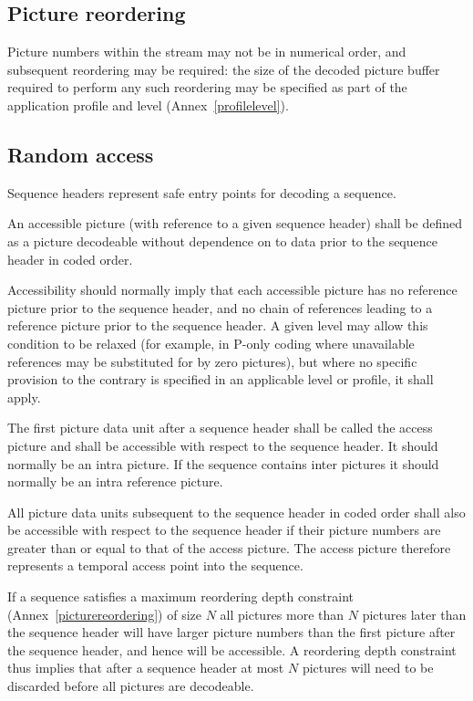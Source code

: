 \subsection{Picture reordering}
Picture numbers within the stream may not be in numerical order, and 
subsequent reordering may be required: the size  
of the decoded picture buffer required to perform any such reordering may be 
specified as part of the application profile and level (Annex~\ref{profilelevel}).
 
\subsection{Random access}
\label{randomaccess}
Sequence headers represent safe entry points for decoding a sequence. 

An accessible picture (with reference to a given sequence header)
shall be defined as a picture decodeable without dependence on 
to data prior to the sequence header in coded order.

Accessibility should normally imply that each accessible picture has
no reference picture prior to the sequence header, and no chain of 
references leading to a reference picture prior to the sequence header. 
A given level may allow this condition to
be relaxed (for example, in P-only coding where unavailable references
may be substituted for by zero pictures), but where no specific provision
to the contrary is specified in an applicable level or profile, it shall 
apply.

The first picture data unit after a sequence header shall be called the 
access picture and shall be accessible with respect to the sequence header.
It should normally be an intra picture. If the sequence contains inter pictures
it should normally be an intra reference picture.

All picture data units subsequent to the sequence header in coded order 
shall also be accessible with respect to the sequence header
if their picture numbers are greater than 
or equal to that of the access picture. The access picture therefore represents 
a temporal access point into the sequence.

\begin{informative}

If a sequence satisfies a maximum reordering depth constraint 
(Annex~\ref{picturereordering})
of size $N$ all pictures more than $N$ pictures later than the sequence header will
have larger picture numbers than the first picture after the sequence header, and hence will be accessible. A reordering depth constraint thus implies that after a 
sequence header at most $N$ pictures will need to be discarded before all pictures are decodeable.
\end{informative}
